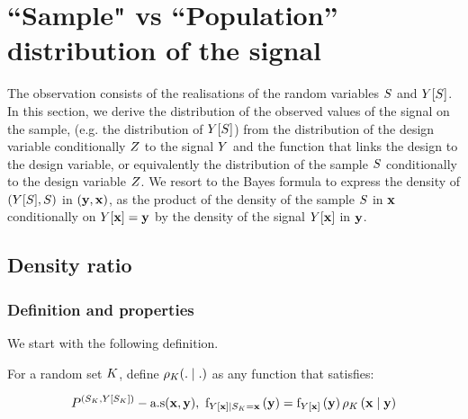 \section{``Sample" vs ``Population''  distribution of the signal}\label{sec:sampledistribution}

The observation consists of the realisations of the random variables $S$ and $Y[S]$. In this section, we derive the distribution of the observed values of the signal on the sample, (e.g. the distribution of $Y[S]$) from  the distribution of the design variable conditionally $Z$ to the signal $Y$ and the function that links the design to the design variable, or equivalently the distribution of the sample $S$ conditionally to the design variable $Z$. We resort to  the Bayes formula to express the density of $(Y[S],S)$ in $(\mathbf{y},\mathbf{x})$,   as the product of the density of the sample $S$ in $\mathbf{x}$ conditionally on $Y[\mathbf{x}]=\mathbf{y}$ by the density of the signal $Y[\mathbf{x}]$ in $\mathbf{y}$. 
\subsection{Density ratio}
\subsubsection{Definition and properties}
We start with the following definition.




\begin{definition}
For a random set $K$, 
define
$\rho_{K}(.\mid.)$ as any function that satisfies:

\begin{equation}
P^{(S_K,Y[S_K])}-\text{a.s}(\mathbf{x},\mathbf{y}),~\mathrm{f}_{Y[\mathbf{x}]\mid S_K=\mathbf{x}}\left(\mathbf{y}\right)=
    \mathrm{f}_{Y[\mathbf{x}]}\left(\mathbf{y}\right)
    \rho_{K}\left(\mathbf{x}\mid  \mathbf{y}\right)\label{eq:owijoj}
\end{equation}

\end{definition}


